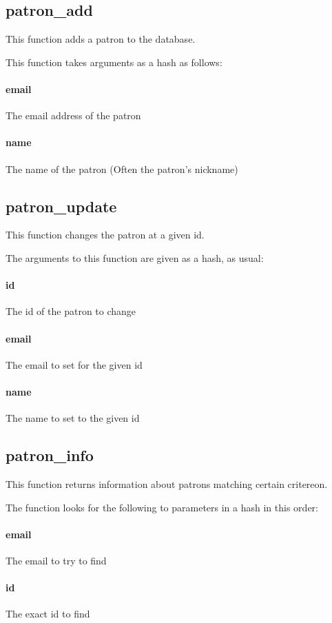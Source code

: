 \documentclass[12pt,titlepage]{article}
\begin{document}
\subsection{patron\_add}
This function adds a patron to the database.

This function takes arguments as a hash as follows:
\paragraph{email}
The email address of the patron 

\paragraph{name}
The name of the patron (Often the patron's nickname)

\subsection{patron\_update}
This function changes the patron at a given id.

The arguments to this function are given as a hash, as usual:
\paragraph{id}
The id of the patron to change 

\paragraph{email}
The email to set for the given id 

\paragraph{name}
The name to set to the given id

\subsection{patron\_info}
This function returns information about patrons matching certain critereon.

The function looks for the following to parameters in a hash in this order:
\paragraph{email}
The email to try to find 

\paragraph{id}
The exact id to find
\end{document}
